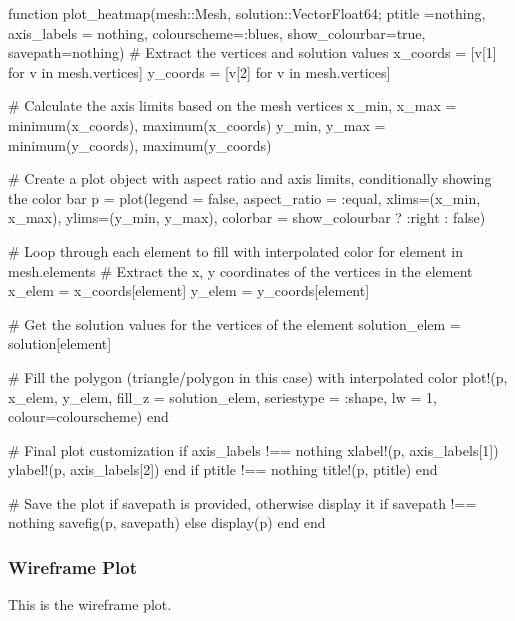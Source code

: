 \begin{jllisting}[style=JuliaStyle]
function plot_heatmap(mesh::Mesh, solution::Vector{Float64}; ptitle =nothing, axis_labels = nothing, colourscheme=:blues, show_colourbar=true, savepath=nothing)
    # Extract the vertices and solution values
    x_coords = [v[1] for v in mesh.vertices]
    y_coords = [v[2] for v in mesh.vertices]

    # Calculate the axis limits based on the mesh vertices
    x_min, x_max = minimum(x_coords), maximum(x_coords)
    y_min, y_max = minimum(y_coords), maximum(y_coords)

    # Create a plot object with aspect ratio and axis limits, conditionally showing the color bar
    p = plot(legend = false, aspect_ratio = :equal, xlims=(x_min, x_max), ylims=(y_min, y_max), 
             colorbar = show_colourbar ? :right : false)

    # Loop through each element to fill with interpolated color
    for element in mesh.elements
        # Extract the x, y coordinates of the vertices in the element
        x_elem = x_coords[element]
        y_elem = y_coords[element]
        
        # Get the solution values for the vertices of the element
        solution_elem = solution[element]

        # Fill the polygon (triangle/polygon in this case) with interpolated color
        plot!(p, x_elem, y_elem, fill_z = solution_elem, seriestype = :shape, lw = 1, colour=colourscheme)
    end

    # Final plot customization
    if axis_labels !== nothing
        xlabel!(p, axis_labels[1])
        ylabel!(p, axis_labels[2])
    end
    if ptitle !== nothing
        title!(p, ptitle)
    end


    # Save the plot if savepath is provided, otherwise display it
    if savepath !== nothing
        savefig(p, savepath)
    else
        display(p)
    end
end
\end{jllisting}

\subsubsection{Wireframe Plot}
This is the wireframe plot.

